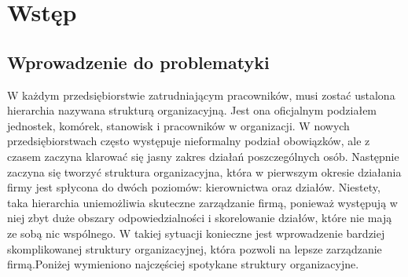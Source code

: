 
\chapter{Wstęp}
\label{ch:wstep}

\section{Wprowadzenie do problematyki}



W każdym przedsiębiorstwie zatrudniającym pracowników, musi zostać ustalona hierarchia nazywana strukturą organizacyjną. Jest ona oficjalnym podziałem jednostek, komórek, stanowisk i pracowników w organizacji. W nowych przedsiębiorstwach często występuje nieformalny podział obowiązków, ale z czasem zaczyna klarować się jasny zakres działań poszczególnych osób. Następnie zaczyna się tworzyć struktura organizacyjna, która w pierwszym okresie działania firmy jest spłycona do dwóch poziomów: kierownictwa oraz działów. Niestety, taka hierarchia uniemożliwia skuteczne zarządzanie firmą, ponieważ występują w niej zbyt duże obszary odpowiedzialności i skorelowanie działów, które nie mają ze sobą nic wspólnego. \cite{bib:zarzadzanie} W takiej sytuacji konieczne jest wprowadzenie bardziej skomplikowanej struktury organizacyjnej, która pozwoli na lepsze zarządzanie firmą.Poniżej wymieniono najczęściej spotykane struktury organizacyjne. \cite{bib:StrukturaOrganizacyjna}

